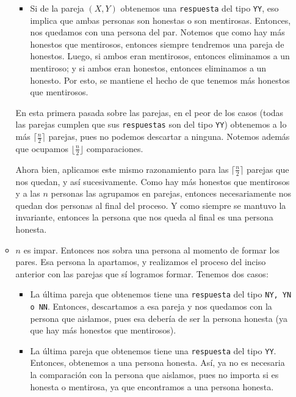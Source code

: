 \documentclass[letterpaper,11pt]{article}
\begin{document}
\begin{enumerate}
\begin{itemize}
\begin{itemize}
            \item Si de la pareja $(X,Y)$ obtenemos una \texttt{respuesta} del 
            tipo \texttt{YY}, eso implica que ambas personas son honestas o 
            son mentirosas. Entonces, nos quedamos con una persona del par. 
            Notemos que como hay más honestos que mentirosos, entonces siempre 
            tendremos una pareja de honestos. Luego, si ambos eran mentirosos, 
            entonces eliminamos a un mentiroso; y si ambos eran honestos, 
            entonces eliminamos a un honesto. Por esto, se mantiene el hecho 
            de que tenemos más honestos que mentirosos. 
        \end{itemize}

        En esta primera pasada sobre las parejas, en el peor de los casos 
        (todas las parejas cumplen que sus \texttt{respuestas} son del tipo 
        \texttt{YY}) obtenemos a lo más $\lceil \frac{n}{2} \rceil$ parejas, 
        pues no podemos descartar a ninguna. Notemos además que ocupamos  
        $\lfloor \frac{n}{2} \rfloor$ comparaciones. 
        
        Ahora bien, aplicamos este mismo razonamiento para las 
        $\lceil \frac{n}{2} \rceil$ parejas que nos quedan, y así sucesivamente.
        Como hay más honestos que mentirosos y a las $n$ personas las agrupamos 
        en parejas, entonces necesariamente nos quedan dos personas al final 
        del proceso. Y como siempre se mantuvo la invariante, entonces la persona 
        que nos queda al final es una persona honesta.  

        \item $n$ es impar. Entonces nos sobra una persona al momento de formar
        los pares. Esa persona la apartamos, y realizamos el proceso del inciso 
        anterior con las parejas que sí logramos formar. Tenemos dos casos:
        \begin{itemize}
            \item La última pareja que obtenemos tiene una \texttt{respuesta} 
            del tipo \texttt{NY, YN o NN}. Entonces, descartamos a esa pareja 
            y nos quedamos con la persona que aislamos, pues esa debería de 
            ser la persona honesta (ya que hay más honestos que mentirosos).

            \item La última pareja que obtenemos tiene una \texttt{respuesta}
            del tipo \texttt{YY}. Entonces, obtenemos a una persona honesta.
            Así, ya no es necesaria la comparación con la persona que aislamos, 
            pues no importa si es honesta o mentirosa, ya que encontramos a una 
            persona honesta. 
        \end{itemize}
    \end{itemize}


\end{enumerate}
\end{document}
